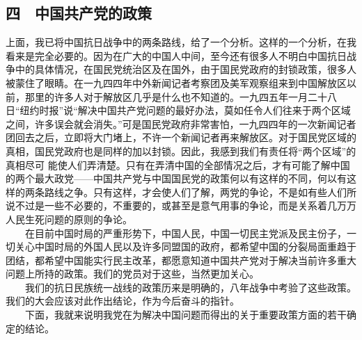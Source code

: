 \documentclass[cn,11pt,chinese]{elegantbook}
\def\myformat#1{\hfil\hfil #1}
\begin{document}
\subsection*{\myformat{四　中国共产党的政策}}
上面，我已将中国抗日战争中的两条路线，给了一个分析。这样的一个分析，在我看来是完全必要的。因为在广大的中国人中间，至今还有很多人不明白中国抗日战争中的具体情况，在国民党统治区及在国外，由于国民党政府的封锁政策，很多人被蒙住了眼睛。在一九四四年中外新闻记者考察团及美军观察组来到中国解放区以前，那里的许多人对于解放区几乎是什么也不知道的。一九四五年一月二十八日“纽约时报”说“解决中国共产党问题的最好办法，莫如任令人们往来于两个区域之间，许多误会就会消失。”可是国民党政府非常害怕，一九四四年的一次新闻记者团回去之后，立即将大门堵上，不许一个新闻记者再来解放区。对于国民党区域的真相，国民党政府也是同样的加以封锁。因此，我感到我们有责任将“两个区域”的真相尽可 能使人们弄清楚。只有在弄清中国的全部情况之后，才有可能了解中国的两个最大政党——中国共产党与中国国民党的政策何以有这样的不同，何以有这样的两条路线之争。只有这样，才会使人们了解，两党的争论，不是如有些人们所说不过是一些不必要的，不重要的，或甚至是意气用事的争论，而是关系着几万万人民生死问题的原则的争论。\\
　　在目前中国时局的严重形势下，中国人民，中国一切民主党派及民主份子，一切关心中国时局的外国人民以及许多同盟国的政府，都希望中国的分裂局面重趋于团结，都希望中国能实行民主改革，都愿意知道中国共产党对于解决当前许多重大问题上所持的政策。我们的党员对于这些，当然更加关心。\\
　　我们的抗日民族统一战线的政策历来是明确的，八年战争中考验了这些政策。我们的大会应该对此作出结论，作为今后奋斗的指针。\\
　　下面，我就来说明我党在为解决中国问题而得出的关于重要政策方面的若干确定的结论。\\
\end{document}
